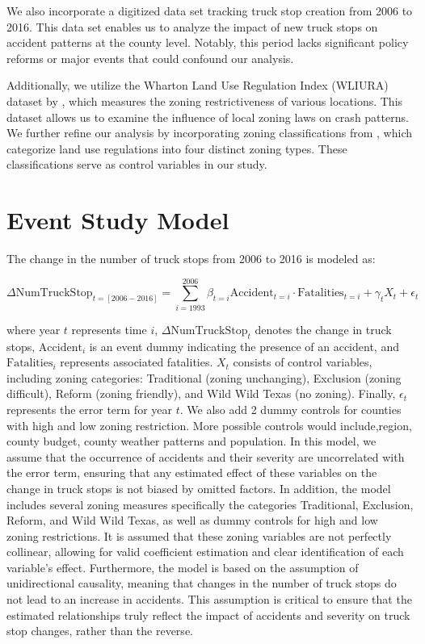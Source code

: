 \documentclass[
  12pt]{article}
\begin{document}
We also incorporate a digitized data set tracking truck stop creation
from 2006 to 2016. This data set enables us to analyze the impact of new
truck stops on accident patterns at the county level. Notably, this
period lacks significant policy reforms or major events that could
confound our analysis.

Additionally, we utilize the Wharton Land Use Regulation Index (WLIURA)
dataset by \citet{gyourkoNewMeasureLocal2008}, which measures the zoning
restrictiveness of various locations. This dataset allows us to examine
the influence of local zoning laws on crash patterns. We further refine
our analysis by incorporating zoning classifications from
\citet{puentesTraditionalReformedReview2006}, which categorize land use
regulations into four distinct zoning types. These classifications serve
as control variables in our study.

\section{Event Study Model}\label{event-study-model-1}

The change in the number of truck stops from 2006 to 2016 is modeled as:

\[ \Delta \text{NumTruckStop}_{t=[2006-2016]} =  \sum_{i=1993}^{2006} \beta_{t=i} \text{Accident}_{t=i}\cdot \text{Fatalities}_{t=i} + \gamma_{t} X_{t} + \epsilon_{t} \]

where year \(t\) represents time \(i\),
\(\Delta\text{NumTruckStop}_{t}\) denotes the change in truck stops,
\(\text{Accident}_{i}\) is an event dummy indicating the presence of an
accident, and \(\text{Fatalities}_{i}\) represents associated
fatalities. \(X_{t}\) consists of control variables, including zoning
categories: Traditional (zoning unchanging), Exclusion (zoning
difficult), Reform (zoning friendly), and Wild Wild Texas (no zoning).
Finally, \(\epsilon_{t}\) represents the error term for year \(t\). We
also add 2 dummy controls for counties with high and low zoning
restriction. More possible controls would include,region, county budget,
county weather patterns and population. In this model, we assume that
the occurrence of accidents and their severity are uncorrelated with the
error term, ensuring that any estimated effect of these variables on the
change in truck stops is not biased by omitted factors. In addition, the
model includes several zoning measures specifically the categories
Traditional, Exclusion, Reform, and Wild Wild Texas, as well as dummy
controls for high and low zoning restrictions. It is assumed that these
zoning variables are not perfectly collinear, allowing for valid
coefficient estimation and clear identification of each variable's
effect. Furthermore, the model is based on the assumption of
unidirectional causality, meaning that changes in the number of truck
stops do not lead to an increase in accidents. This assumption is
critical to ensure that the estimated relationships truly reflect the
impact of accidents and severity on truck stop changes, rather than the
reverse.
\end{document}

